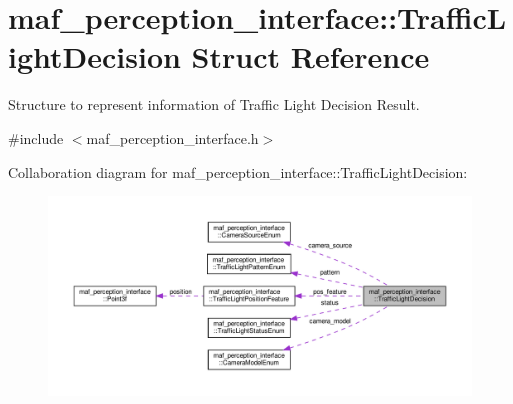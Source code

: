 \hypertarget{structmaf__perception__interface_1_1TrafficLightDecision}{}\section{maf\+\_\+perception\+\_\+interface\+:\+:Traffic\+Light\+Decision Struct Reference}
\label{structmaf__perception__interface_1_1TrafficLightDecision}


Structure to represent information of Traffic Light Decision Result.  




{\ttfamily \#include $<$maf\+\_\+perception\+\_\+interface.\+h$>$}



Collaboration diagram for maf\+\_\+perception\+\_\+interface\+:\+:Traffic\+Light\+Decision\+:\nopagebreak
\begin{figure}[H]
\begin{center}
\leavevmode
\includegraphics[width=350pt]{structmaf__perception__interface_1_1TrafficLightDecision__coll__graph}
\end{center}
\end{figure}
